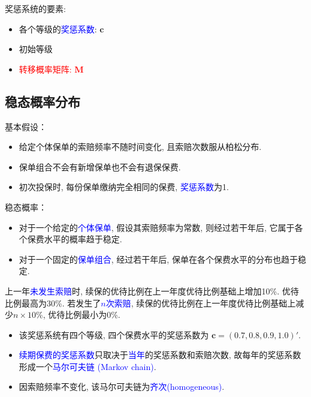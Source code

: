 \documentclass[professionalfont]{beamer}
\def\bM{\boldsymbol{M}}
\def\bc{\boldsymbol{c}}
\newcommand{\red}[1]{\textcolor{red}{#1}}
\newcommand{\blue}[1]{\textcolor{blue}{#1}}
\begin{document}
\begin{frame}
奖惩系统的要素:
\begin{itemize}
\item 各个等级的\blue{奖惩系数}: $\bc$
\item 初始等级
\item \red{转移概率矩阵: $\bM$}
\end{itemize}
\end{frame}
\subsection{稳态概率分布}

\begin{frame}
基本假设：
\begin{itemize}
\item 给定个体保单的索赔频率不随时间变化, 且索赔次数服从柏松分布.
\item 保单组合不会有新增保单也不会有退保保费.
\item 初次投保时, 每份保单缴纳完全相同的保费, \blue{奖惩系数}为1.
\end{itemize}
稳态概率：
\begin{itemize}
\item 对于一个给定的\blue{个体保单}, 假设其索赔频率为常数, 则经过若干年后, 它属于各个保费水平的概率趋于稳定. 
\item 对于一个固定的\blue{保单组合}, 经过若干年后, 保单在各个保费水平的分布也趋于稳定.
\end{itemize}
\end{frame}

\begin{frame}
上一年\blue{未发生索赔}时, 续保的优待比例在上一年度优待比例基础上增加10\%. 优待比例最高为30\%. 若发生了\blue{$n$次索赔}, 续保的优待比例在上一年度优待比例基础上减少$n\times10\%$, 优待比例最小为0\%. 
\begin{itemize}
\item 该奖惩系统有四个等级, 四个保费水平的奖惩系数为 $\bc=(0.7, 0.8, 0.9, 1.0)'$. 
\item \blue{续期保费的奖惩系数}只取决于\blue{当年}的奖惩系数和索赔次数, 故每年的奖惩系数形成一个\blue{马尔可夫链 (Markov chain)}.
\item 因索赔频率不变化, 该马尔可夫链为\blue{齐次(homogeneous)}.
\end{itemize}
\end{frame}
\end{document}
